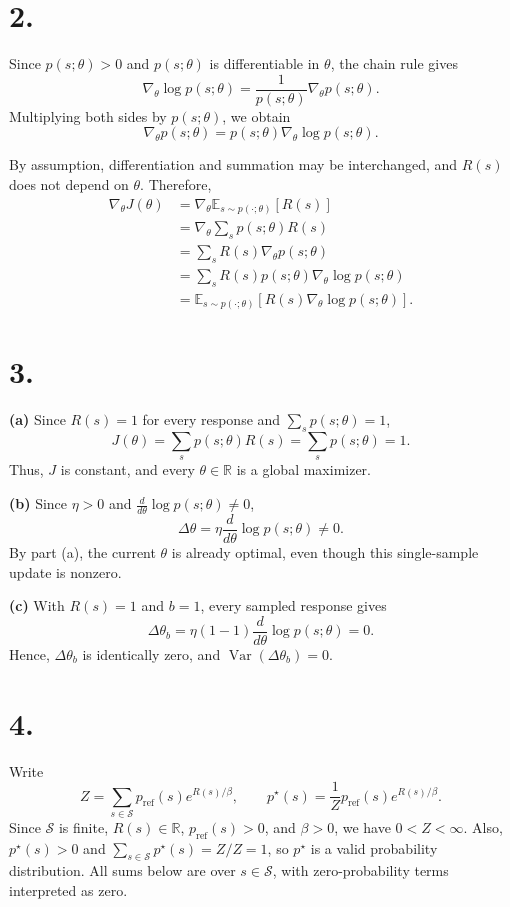 \documentclass[11pt,a4paper]{article}
\newcommand{\E}{\mathbb{E}}
\DeclareMathOperator{\Var}{Var}
\newcommand{\pref}{p_{\mathrm{ref}}}
\begin{document}
\section*{2.}

Since \(p(s;\theta)>0\) and \(p(s;\theta)\) is differentiable in \(\theta\),
the chain rule gives
\[
\nabla_\theta\log p(s;\theta)
=\frac{1}{p(s;\theta)}\nabla_\theta p(s;\theta).
\]
Multiplying both sides by \(p(s;\theta)\), we obtain
\[
\nabla_\theta p(s;\theta)
=p(s;\theta)\nabla_\theta\log p(s;\theta).
\]

By assumption, differentiation and summation may be interchanged, and
\(R(s)\) does not depend on \(\theta\). Therefore,
\[
\begin{aligned}
\nabla_\theta J(\theta)
&=\nabla_\theta\E_{s\sim p(\cdot;\theta)}[R(s)]\\
&=\nabla_\theta\sum_s p(s;\theta)R(s)\\
&=\sum_s R(s)\nabla_\theta p(s;\theta)\\
&=\sum_s R(s)p(s;\theta)\nabla_\theta\log p(s;\theta)\\
&=\E_{s\sim p(\cdot;\theta)}
  \left[R(s)\nabla_\theta\log p(s;\theta)\right].
\end{aligned}
\]

\newpage
\section*{3.}

\textbf{(a)}
Since \(R(s)=1\) for every response and \(\sum_s p(s;\theta)=1\),
\[
J(\theta)=\sum_s p(s;\theta)R(s)=\sum_s p(s;\theta)=1.
\]
Thus, \(J\) is constant, and every \(\theta\in\mathbb{R}\) is a global maximizer.

\textbf{(b)}
Since \(\eta>0\) and \(\frac{d}{d\theta}\log p(s;\theta)\neq 0\),
\[
\Delta\theta=\eta\frac{d}{d\theta}\log p(s;\theta)\neq 0.
\]
By part (a), the current \(\theta\) is already optimal, even though this
single-sample update is nonzero.

\textbf{(c)}
With \(R(s)=1\) and \(b=1\), every sampled response gives
\[
\Delta\theta_b
=\eta(1-1)\frac{d}{d\theta}\log p(s;\theta)=0.
\]
Hence, \(\Delta\theta_b\) is identically zero, and
\(\Var(\Delta\theta_b)=0\).

\section*{4.}

Write
\[
Z=\sum_{s\in\mathcal{S}}\pref(s)e^{R(s)/\beta},
\qquad
p^\star(s)=\frac{1}{Z}\pref(s)e^{R(s)/\beta}.
\]
Since \(\mathcal{S}\) is finite, \(R(s)\in\mathbb{R}\),
\(\pref(s)>0\), and \(\beta>0\), we have \(0<Z<\infty\).
Also, \(p^\star(s)>0\) and \(\sum_{s\in\mathcal{S}}p^\star(s)=Z/Z=1\),
so \(p^\star\) is a valid probability distribution. All sums below are over
\(s\in\mathcal{S}\), with zero-probability terms interpreted as zero.
\end{document}

